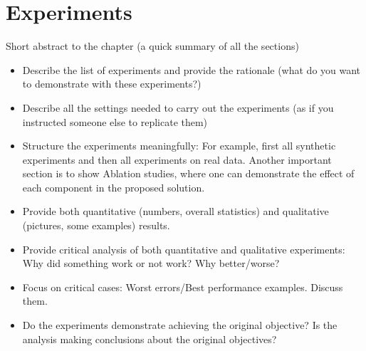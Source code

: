 \chapter{Experiments}
\label{ch:experiments}

Short abstract to the chapter (a quick summary of all the sections)

\begin{itemize}
\item Describe the list of experiments and provide the rationale (what do you want to demonstrate with these experiments?)
\item Describe all the settings needed to carry out the experiments (as if you instructed someone else to replicate them)
\item Structure the experiments meaningfully: For example, first all synthetic experiments and then all experiments on real data.
Another important section is to show Ablation studies, where one can demonstrate the effect of each component in the proposed solution.
\item Provide both quantitative (numbers, overall statistics) and qualitative (pictures, some examples) results.
\item Provide critical analysis of both quantitative and qualitative experiments: Why did something work or not work? Why better/worse?
\item Focus on critical cases: Worst errors/Best performance examples. Discuss them.
\item Do the experiments demonstrate achieving the original objective? Is the analysis making conclusions about the original objectives?
\end{itemize}